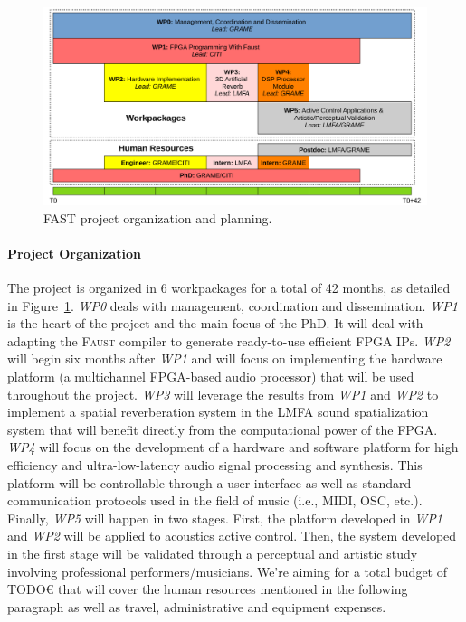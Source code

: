 \documentclass[a4paper,10pt]{article}
\newcommand{\F}{\textsc{Faust}}
\newcommand{\PP}{FAST}
\begin{document}
\begin{figure}[h]
  \centering
  \includegraphics[width=\columnwidth]{img/wp}
	\vspace{-1cm}
  \caption{\PP{} project organization and planning.}
  \label{fig:wp}
\end{figure}

\paragraph{Project Organization}

The project is organized in 6 workpackages for a total of 42 months, as detailed in Figure~\ref{fig:wp}. \textit{WP0} deals with management, coordination and dissemination. \textit{WP1} is the heart of the project and the main focus of the PhD. It will deal with adapting the \F{} compiler to generate ready-to-use efficient FPGA IPs. \textit{WP2} will begin six months after \textit{WP1} and will focus on implementing the hardware platform (a multichannel FPGA-based audio processor) that will be used throughout the project. \textit{WP3} will leverage the results from \textit{WP1} and \textit{WP2} to implement a spatial reverberation system in the LMFA sound spatialization system that will benefit directly from the computational power of the FPGA. \textit{WP4} will focus on the development of a hardware and software platform for high efficiency and ultra-low-latency audio signal processing and synthesis. This platform will be controllable through a user interface as well as standard communication protocols used in the field of music (i.e., MIDI, OSC, etc.).
Finally, \textit{WP5} will happen in two stages. First, the platform developed in \textit{WP1} and \textit{WP2} will be applied to acoustics active control. Then, the system developed in the first stage will be validated through a perceptual and artistic study involving professional performers/musicians. We're aiming for a total budget of TODO\euro{} that will cover the human resources mentioned in the following paragraph as well as travel, administrative and equipment expenses.
\end{document}
